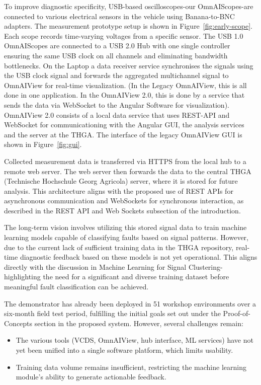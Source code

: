 To improve diagnostic specificity, USB-based oscilloscopes-our OmnAIScopes-are connected to various electrical sensors in the vehicle using Banana-to-BNC adapters. 
The measurement prototype setup is shown in Figure~\ref{fig:early-scope}.
Each scope records time-varying voltages from a specific sensor. 
The USB 1.0 OmnAIScopes are connected to a USB 2.0 Hub with one single controller ensuring the same USB clock on all channels and eliminating bandwidth bottlenecks. 
On the Laptop a data receiver service synchronises the signals using the USB clock signal and forwards the aggregated multichannel signal to OmnAIView for real-time visualization. 
(In the Legacy OmnAIView, this is all done in one application. In the OmnAIView 2.0, this is done by a service that sends the data via WebSocket to the Angular Software for visualization).
OmnAIView 2.0 consists of a local data service that uses REST-API and WebSocket for communicationing with the Angular GUI, the analysis services and the server at the THGA.
The interface of the legacy OmnAIView GUI is shown in Figure~\ref{fig:gui}.

Collected measurement data is transferred via HTTPS from the local hub to a remote web server. 
The web server then forwards the data to the central THGA (Technische Hochschule Georg Agricola) server, where it is stored for future analysis. 
This architecture aligns with the proposed use of REST APIs for asynchronous communication and WebSockets for synchronous interaction, as described in the REST API and Web Sockets subsection of the introduction.

The long-term vision involves utilizing this stored signal data to train machine learning models capable of classifying faults based on signal patterns. 
However, due to the current lack of sufficient training data in the THGA repository, real-time diagnostic feedback based on these models is not yet operational. 
This aligns directly with the discussion in Machine Learning for Signal Clustering-highlighting the need for a significant and diverse training dataset before meaningful fault classification can be achieved.

The demonstrator has already been deployed in 51 workshop environments over a six-month field test period, 
fulfilling the initial goals set out under the Proof-of-Concepts section in the proposed system. 
However, several challenges remain:
\begin{itemize}
  \item The various tools (VCDS, OmnAIView, hub interface, ML services) have not yet been unified into a single software platform, which limits usability.
  \item Training data volume remains insufficient, restricting the machine learning module’s ability to generate actionable feedback.
\end{itemize}




